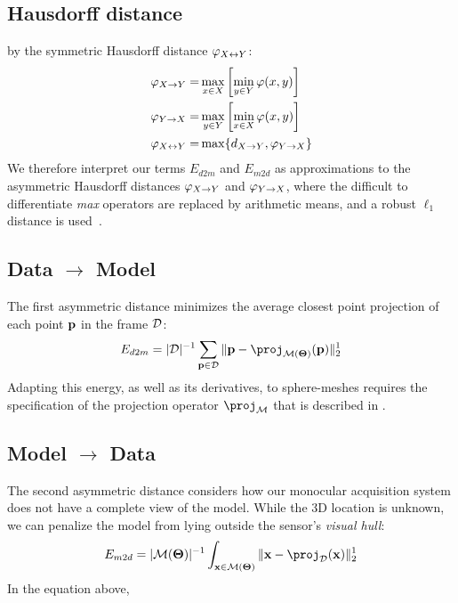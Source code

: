 \subsection*{Hausdorff distance} 
by the symmetric Hausdorff distance $\varphi_{X \leftrightarrow Y}$:
% 
\begin{eqnarray*}
\varphi_{X \rightarrow Y} =& \max_{x \in X} \left[ \min_{y \in Y} \varphi(x,y) \right] \\
\varphi_{Y \rightarrow X} =& \max_{y \in Y} \left[ \min_{x \in X} \varphi(x,y) \right] \\
\varphi_{X \leftrightarrow Y} =& \max \{ d_{X \rightarrow Y}, \varphi_{Y \rightarrow X} \}
\end{eqnarray*}
We therefore interpret our terms $E_{d2m}$ and $E_{m2d}$ as approximations to the asymmetric Hausdorff distances $\varphi_{X \rightarrow Y}$ and $\varphi_{Y \rightarrow X}$, where the difficult to differentiate \emph{max} operators are replaced by arithmetic means, and a robust $\ell_1$ distance is used~\cite{regcourse}.



\subsection*{Data $\rightarrow$ Model}
The first asymmetric distance minimizes the average closest point projection of each point $\mathbf{p}$ in the  frame $\mathcal{D}$:
%
\begin{equation}
E_{d2m} = |\depth|^{-1} \sum_{\pointHmodel \in \depth} \| \pointHmodel - \proj_{\model(\parsHmodel)}(\pointHmodel)\|_2^1
\label{eq:d2m}
\end{equation}
% 
Adapting this energy, as well as its derivatives, to sphere-meshes requires the specification of the projection operator $\proj_\model$ that is described in .

\subsection*{Model $\rightarrow$ Data}
The second asymmetric distance considers how our monocular acquisition system does not have a complete view of the model. While the 3D location is unknown, we can penalize the model from lying outside the sensor's \emph{visual hull}:
\begin{equation}
E_{m2d} = |\model(\parsHmodel)|^{-1} \int_{\pixelHmodel \in \model(\parsHmodel)} \| \pixelHmodel - \proj_{\depth}(\pixelHmodel)\|_2^1
\label{eq:m2d}
\end{equation}
In the equation above, 
